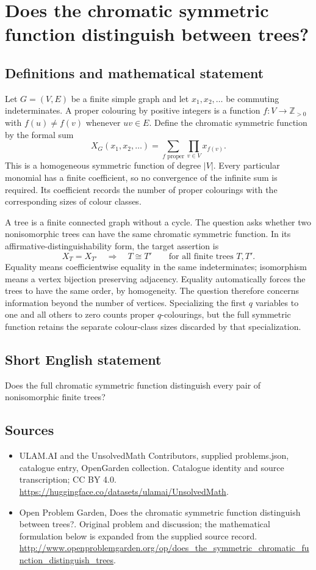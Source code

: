 \documentclass[11pt,a4paper]{article}
\begin{document}
\section*{Does the chromatic symmetric function distinguish between trees?}\label{statement}

\subsection{Definitions and mathematical statement}
Let $G=(V,E)$ be a finite simple graph and let
$x_1,x_2,\ldots$ be commuting indeterminates. A proper colouring by
positive integers is a function $f:V\to\mathbb Z_{>0}$ with
$f(u)\neq f(v)$ whenever $uv\in E$. Define the chromatic symmetric
function by the formal sum
\[
 X_G(x_1,x_2,\ldots)
   =\sum_{f\text{ proper}}\prod_{v\in V}x_{f(v)}.
\]
This is a homogeneous symmetric function of degree $|V|$. Every
particular monomial has a finite coefficient, so no convergence
of the infinite sum is required. Its coefficient records the
number of proper colourings with the corresponding sizes of
colour classes.

A tree is a finite connected graph without a cycle. The question
asks whether two nonisomorphic trees can have the same chromatic
symmetric function. In its affirmative-distinguishability form,
the target assertion is
\[
 X_T=X_{T'}\quad\Longrightarrow\quad T\cong T'
 \qquad\text{for all finite trees }T,T'.
\]
Equality means coefficientwise equality in the same indeterminates;
isomorphism means a vertex bijection preserving adjacency. Equality
automatically forces the trees to have the same order, by
homogeneity. The question therefore concerns information beyond
the number of vertices. Specializing the first $q$ variables to
one and all others to zero counts proper $q$-colourings, but the
full symmetric function retains the separate colour-class sizes
discarded by that specialization.
\subsection{Short English statement}
Does the full chromatic symmetric function distinguish every pair of nonisomorphic finite trees?
\subsection{Sources}
\begin{itemize}
\item[S1] ULAM.AI and the UnsolvedMath Contributors, supplied problems.json, catalogue entry, OpenGarden collection. Catalogue identity and source transcription; CC BY 4.0.
\url{https://huggingface.co/datasets/ulamai/UnsolvedMath}.
\item[S2] Open Problem Garden, Does the chromatic symmetric function distinguish between trees?. Original problem and discussion; the mathematical formulation below is expanded from the supplied source record.
\url{http://www.openproblemgarden.org/op/does_the_symmetric_chromatic_function_distinguish_trees}.
\end{itemize}
\end{document}
